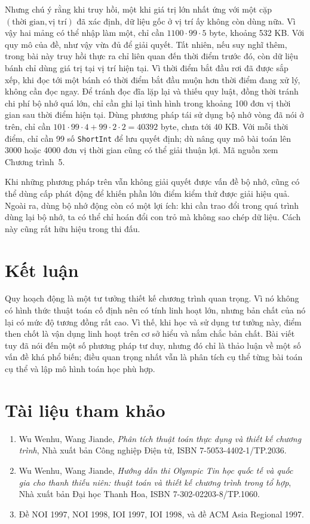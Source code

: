 \documentclass[11pt]{article}
\begin{document}
Nhưng chú ý rằng khi truy hồi, một khi giá trị lớn nhất ứng với một cặp
\((\text{thời gian},\text{vị trí})\) đã xác định, dữ liệu gốc ở vị trí ấy
không còn dùng nữa. Vì vậy hai mảng có thể nhập làm một, chỉ cần
\(1100\cdot99\cdot5\) byte, khoảng 532 KB. Với quy mô của đề, như vậy vừa đủ
để giải quyết. Tất nhiên, nếu suy nghĩ thêm, trong bài này truy hồi thực ra
chỉ liên quan đến thời điểm trước đó, còn dữ liệu bánh chỉ dùng giá trị tại vị
trí hiện tại. Vì thời điểm bắt đầu rơi đã được sắp xếp, khi đọc tới một bánh
có thời điểm bắt đầu muộn hơn thời điểm đang xử lý, không cần đọc ngay. Để
tránh đọc đĩa lặp lại và thiếu quy luật, đồng thời tránh chi phí bộ nhớ quá
lớn, chỉ cần ghi lại tình hình trong khoảng 100 đơn vị thời gian sau thời điểm
hiện tại. Dùng phương pháp tái sử dụng bộ nhớ vòng đã nói ở trên, chỉ cần
\(101\cdot99\cdot4+99\cdot2\cdot2=40392\) byte, chưa tới 40 KB. Với mỗi thời
điểm, chỉ cần 99 số \texttt{ShortInt} để lưu quyết định; dù nâng quy mô bài
toán lên 3000 hoặc 4000 đơn vị thời gian cũng có thể giải thuận lợi. Mã nguồn
xem Chương trình~5.

Khi những phương pháp trên vẫn không giải quyết được vấn đề bộ nhớ, cũng có
thể dùng cấp phát động để khiến phần lớn điểm kiểm thử được giải hiệu quả.
Ngoài ra, dùng bộ nhớ động còn có một lợi ích: khi cần trao đổi trong quá
trình dùng lại bộ nhớ, ta có thể chỉ hoán đổi con trỏ mà không sao chép dữ
liệu. Cách này cũng rất hữu hiệu trong thi đấu.

\section{Kết luận}

Quy hoạch động là một tư tưởng thiết kế chương trình quan trọng. Vì nó không
có hình thức thuật toán cố định nên có tính linh hoạt lớn, nhưng bản chất của
nó lại có mức độ tương đồng rất cao. Vì thế, khi học và sử dụng tư tưởng này,
điểm then chốt là vận dụng linh hoạt trên cơ sở hiểu và nắm chắc bản chất.
Bài viết tuy đã nói đến một số phương pháp tư duy, nhưng đó chỉ là thảo luận
về một số vấn đề khá phổ biến; điều quan trọng nhất vẫn là phân tích cụ thể
từng bài toán cụ thể và lập mô hình toán học phù hợp.

\section*{Tài liệu tham khảo}

\begin{enumerate}
  \item Wu Wenhu, Wang Jiande, \textit{Phân tích thuật toán thực dụng và thiết
  kế chương trình}, Nhà xuất bản Công nghiệp Điện tử, ISBN
  7-5053-4402-1/TP.2036.
  \item Wu Wenhu, Wang Jiande, \textit{Hướng dẫn thi Olympic Tin học quốc tế
  và quốc gia cho thanh thiếu niên: thuật toán và thiết kế chương trình trong
  tổ hợp}, Nhà xuất bản Đại học Thanh Hoa, ISBN 7-302-02203-8/TP.1060.
  \item Đề NOI 1997, NOI 1998, IOI 1997, IOI 1998, và đề ACM Asia Regional
  1997.
\end{enumerate}
\end{document}
